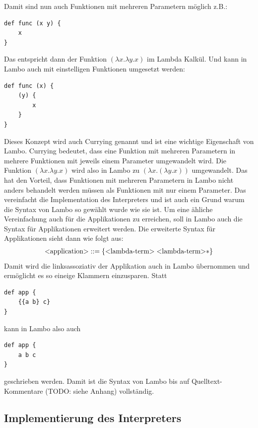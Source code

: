 \documentclass[ngerman]{article}
\begin{document}
Damit sind nun auch Funktionen mit mehreren Parametern möglich z.B.:
\begin{lstlisting}
def func (x y) {
    x
}
\end{lstlisting}
Das entspricht dann der Funktion $(\lambda x.\lambda y.x)$ im Lambda Kalkül. Und kann in Lambo auch mit einstelligen Funktionen umgesetzt werden:
\begin{lstlisting}
def func (x) {
    (y) {
        x
    }
}
\end{lstlisting}
Dieses Konzept wird auch Currying genannt und ist eine wichtige Eigenschaft von Lambo. Currying bedeutet, dass eine Funktion mit mehreren Parametern in mehrere Funktionen mit jeweils einem Parameter umgewandelt wird. Die Funktion $(\lambda x.\lambda y.x)$ wird also in Lambo zu $(\lambda x.(\lambda y.x))$ umgewandelt. Das hat den Vorteil, dass Funktionen mit mehreren Parametern in Lambo nicht anders behandelt werden müssen als Funktionen mit nur einem Parameter. Das vereinfacht die Implementation des Interpreters und ist auch ein Grund warum die Syntax von Lambo so gewählt wurde wie sie ist. Um eine ähliche Vereinfachung auch für die Applikationen zu erreichen, soll in Lambo auch die Syntax für Applikationen erweitert werden. Die erweiterte Syntax für Applikationen sieht dann wie folgt aus:
\begin{align*}
    \text{\textless application\textgreater} & ::= \{\text{\textless lambda-term\textgreater} \; \text{\textless lambda-term\textgreater}*\} \\
\end{align*}
Damit wird die linksassoziativ der Applikation auch in Lambo übernommen und ermöglicht es so eineige Klammern einzusparen. Statt
\begin{lstlisting}
def app {
    {{a b} c}
}
\end{lstlisting}
kann in Lambo also auch
\begin{lstlisting}
def app {
    a b c
}
\end{lstlisting}
geschrieben werden. Damit ist die Syntax von Lambo bis auf Quelltext-Kommentare (TODO: siehe Anhang) vollständig.

\subsection{Implementierung des Interpreters}

\captionsetup{labelformat=empty}
\lstset{
    language=Java,
    frame=single,
    breaklines=true,
    numbers=left,
    stepnumber=1,
    showstringspaces=false,
    tabsize=1,
    breaklines=true,
    breakatwhitespace=false,
    xleftmargin=.1\textwidth,
    xrightmargin=.1\textwidth
}
\end{document}
